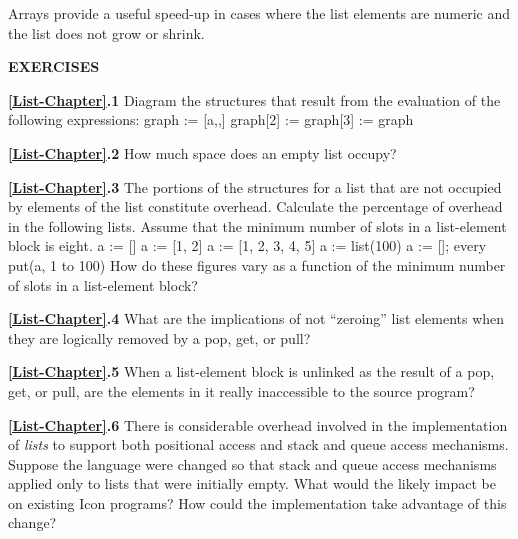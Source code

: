 Arrays provide a useful speed-up in cases where the list elements are
numeric and the list does not grow or shrink.

\bigskip

\noindent\textbf{EXERCISES}

\noindent\textbf{\ref*{List-Chapter}.1}
Diagram the structures that result from the evaluation of the
following expressions:\newline
 graph := [{\textquotedbl}a{\textquotedbl},,]\newline
 graph[2] := graph[3] := graph

\noindent\textbf{\ref*{List-Chapter}.2}
How much space does an empty list occupy?

\noindent\textbf{\ref*{List-Chapter}.3}
The portions of the structures for a list that are not occupied
by elements of the list constitute overhead. Calculate the percentage
of overhead in the following lists. Assume that the minimum number of
slots in a list-element block is eight.\newline
 a := []\newline
 a := [1, 2]\newline
 a := [1, 2, 3, 4, 5]\newline
 a := list(100)\newline
 a := []; every put(a, 1 to 100)\newline
How do these figures vary as a function of the minimum number of slots
in a list-element block?

\noindent\textbf{\ref*{List-Chapter}.4}
What are the implications of not ``zeroing'' list elements when
they are logically removed by a pop, get, or pull?

\noindent\textbf{\ref*{List-Chapter}.5}
When a list-element block is unlinked as the result of a pop,
get, or pull, are the elements in it really inaccessible to the
source program?

\noindent\textbf{\ref*{List-Chapter}.6}
There is considerable overhead involved in the implementation of
\textit{lists }to support both positional access and stack and queue
access mechanisms. Suppose the language were changed so that stack and
queue access mechanisms applied only to lists that were initially
empty. What would the likely impact be on existing Icon programs? How
could the implementation take advantage of this change?

